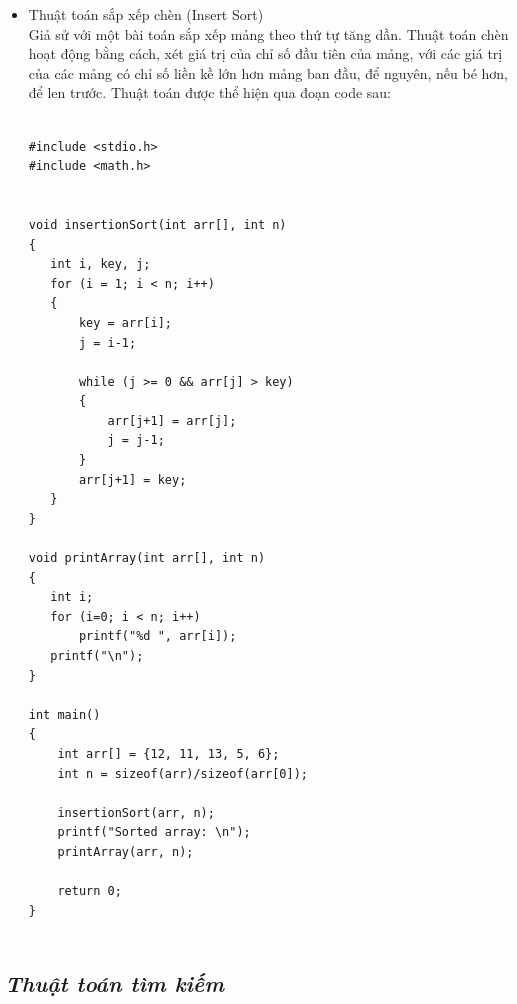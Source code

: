\documentclass[12pt,a4paper]{article}
\begin{document}
\begin{itemize}
\begin{lstlisting}
#include <stdio.h>
 
void swap(int &xp, int &yp)
{
    int temp = xp;
    xp = yp;
    yp = temp;
}
 
void selectionSort(int arr[], int n)
{
    int i, j, min_idx;
    for (i = 0; i < n-1; i++)
    {
    min_idx = i;
    for (j = i+1; j < n; j++)
        if (arr[j] < arr[min_idx])
        min_idx = j;
 
        swap(arr[min_idx], arr[i]);
    }
}
 
void printArray(int arr[], int size)
{
    int i;
    for (i=0; i < size; i++)
        printf("%d ", arr[i]);
    printf("n");
}
 
int main()
{
    int arr[] = {64, 25, 12, 22, 11};
    int n = sizeof(arr)/sizeof(arr[0]);
    selectionSort(arr, n);
    printf("Sorted array: n");
    printArray(arr, n);
    return 0;
}
\end{lstlisting}
	\item Thuật toán sắp xếp chèn (Insert Sort)\\
Giả sử với một bài toán sắp xếp mảng theo thứ tự tăng dần. Thuật toán chèn hoạt động bằng cách, xét giá trị của chỉ số đầu tiên của mảng, với các giá trị của các mảng có chỉ số liền kề lớn hơn mảng ban đầu, để nguyên, nếu bé hơn, để len trước. Thuật toán được thể hiện qua đoạn code sau: \\
\begin{lstlisting}
	
#include <stdio.h>
#include <math.h>
 

void insertionSort(int arr[], int n)
{
   int i, key, j;
   for (i = 1; i < n; i++)
   {
       key = arr[i];
       j = i-1;
 
       while (j >= 0 && arr[j] > key)
       {
           arr[j+1] = arr[j];
           j = j-1;
       }
       arr[j+1] = key;
   }
}
 
void printArray(int arr[], int n)
{
   int i;
   for (i=0; i < n; i++)
       printf("%d ", arr[i]);
   printf("\n");
}
 
int main()
{
    int arr[] = {12, 11, 13, 5, 6};
    int n = sizeof(arr)/sizeof(arr[0]);
 
    insertionSort(arr, n);
    printf("Sorted array: \n");
    printArray(arr, n);
 
    return 0;
}
 

\end{lstlisting}
\end{itemize}
\begin{center}
	\subsection*{\textbf{\textit{Thuật toán tìm kiếm}}}
\end{center}
\end{document}
